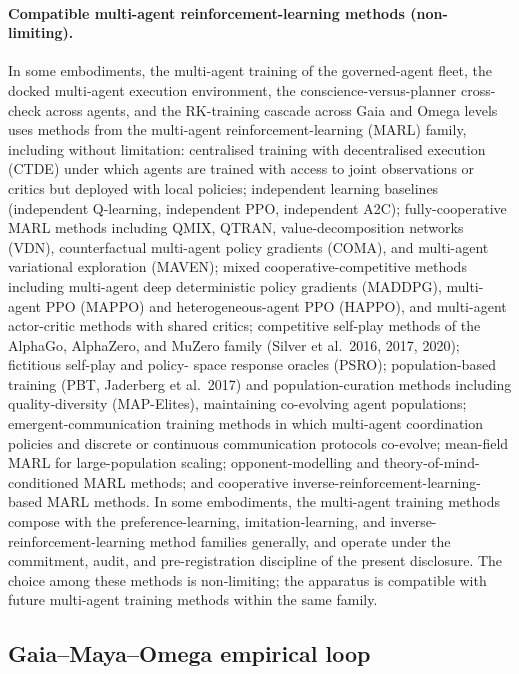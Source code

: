 \documentclass[a4paper,12pt]{article}
\begin{document}
\paragraph{Compatible multi-agent reinforcement-learning methods
  (non-limiting).}
In some embodiments, the multi-agent training of the governed-agent
fleet, the docked multi-agent execution environment, the
conscience-versus-planner cross-check across agents, and the
RK-training cascade across Gaia and Omega levels uses methods from
the multi-agent reinforcement-learning (MARL) family, including
without limitation: centralised training with decentralised
execution (CTDE) under which agents are trained with access to
joint observations or critics but deployed with local policies;
independent learning baselines (independent Q-learning, independent
PPO, independent A2C); fully-cooperative MARL methods including
QMIX, QTRAN, value-decomposition networks (VDN), counterfactual
multi-agent policy gradients (COMA), and multi-agent variational
exploration (MAVEN); mixed cooperative-competitive methods
including multi-agent deep deterministic policy gradients (MADDPG),
multi-agent PPO (MAPPO) and heterogeneous-agent PPO (HAPPO), and
multi-agent actor-critic methods with shared critics; competitive
self-play methods of the AlphaGo, AlphaZero, and MuZero family
(Silver et al.\ 2016, 2017, 2020); fictitious self-play and policy-
space response oracles (PSRO); population-based training (PBT,
Jaderberg et al.\ 2017) and population-curation methods including
quality-diversity (MAP-Elites), maintaining co-evolving agent
populations; emergent-communication training methods in which
multi-agent coordination policies and discrete or continuous
communication protocols co-evolve; mean-field MARL for
large-population scaling; opponent-modelling and
theory-of-mind-conditioned MARL methods; and cooperative
inverse-reinforcement-learning-based MARL methods. In some
embodiments, the multi-agent training methods compose with the
preference-learning, imitation-learning, and
inverse-reinforcement-learning method families generally, and
operate under the commitment, audit, and pre-registration
discipline of the present disclosure. The choice
among these methods is non-limiting; the apparatus is compatible
with future multi-agent training methods within the same family.

\subsection{Gaia--Maya--Omega empirical loop}
\label{sec:gaia-maya-omega}
\end{document}
